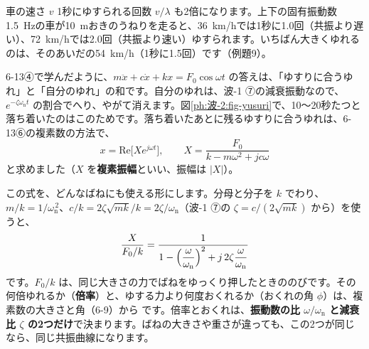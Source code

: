 \begin{phbaisuru}{車の速さ $v$}
1秒にゆすられる回数 $v/\lambda$ も2倍になります。上下の固有振動数\qty{1.5}{Hz}の車が\qty{10}{m}おきのうねりを走ると、\qty{36}{km/h}では1秒に1.0回（共振より遅い）、\qty{72}{km/h}では2.0回（共振より速い）ゆすられます。いちばん大きくゆれるのは、そのあいだの\qty{54}{km/h}（1秒に1.5回）です（例題9）。
\end{phbaisuru}

\begin{phmodel}[ゆすられるばね]
\end{phmodel}
\phkokomade


\label{ph:波-2:sec4}
6-13④で学んだように、$m\ddot x+c\dot x+kx=F_0\cos\omega t$ の答えは、「ゆすりに合うゆれ」と「自分のゆれ」の和です。自分のゆれは、波-1 ⑦の減衰振動なので、$e^{-\zeta\omega_{\mathrm n}t}$ の割合でへり、やがて消えます。図\ref{ph:波-2:fig-yusuri}で、10〜20秒たつと落ち着いたのはこのためです。落ち着いたあとに残るゆすりに合うゆれは、6-13⑥の複素数の方法で、
\[x=\mathrm{Re}\bigl[Xe^{j\omega t}\bigr],\qquad X=\frac{F_0}{k-m\omega^2+jc\omega}\]
と求めました（$X$ を\textbf{複素振幅}といい、振幅は $\lvert X\rvert$）。

この式を、どんなばねにも使える形にします。分母と分子を $k$ でわり、$m/k=1/\omega_{\mathrm n}^{\,2}$、$c/k=2\zeta\sqrt{mk}/k=2\zeta/\omega_{\mathrm n}$（波-1 ⑦の $\zeta=c/(2\sqrt{mk})$ から）を使うと、
\[\frac{X}{F_0/k}=\frac{1}{1-\Bigl(\dfrac{\omega}{\omega_{\mathrm n}}\Bigr)^2+j\,2\zeta\dfrac{\omega}{\omega_{\mathrm n}}}\]
です。$F_0/k$ は、同じ大きさの力でばねをゆっくり押したときののびです。その何倍ゆれるか（\textbf{倍率}）と、ゆする力より何度おくれるか（おくれの角 $\phi$）は、複素数の大きさと角（6-9）から
\label{ph:波-2:bairitsu}です。倍率とおくれは、\textbf{振動数の比 $\omega/\omega_{\mathrm n}$ と減衰比 $\zeta$ の2つだけ}で決まります。ばねの大きさや重さが違っても、この2つが同じなら、同じ共振曲線になります。

